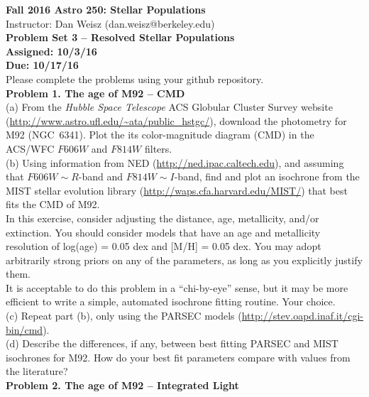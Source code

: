 \documentclass{article}
\begin{document}
\noindent \textbf{\large{Fall 2016 Astro 250: Stellar Populations}} \\
\noindent Instructor: Dan Weisz (dan.weisz@berkeley.edu) \\
\textbf{\large{Problem Set 3 -- Resolved Stellar Populations}} \\
\textbf{{Assigned: 10/3/16}} \\
\textbf{{Due: 10/17/16}} \\

Please complete the problems using your github repository. \\


\noindent \textbf{Problem 1. The age of M92 -- CMD} \\ 

(a) From the \textit{Hubble Space Telescope} ACS Globular Cluster Survey website (\url{http://www.astro.ufl.edu/~ata/public_hstgc/}), download the photometry for M92 (NGC~6341).  Plot the its color-magnitude diagram (CMD) in the ACS/WFC $F606W$ and $F814W$ filters. \\

(b) Using information from NED (\url{http://ned.ipac.caltech.edu}), and assuming that $F606W \sim R$-band and $F814W \sim I$-band, find and plot an isochrone from the MIST stellar evolution library (\url{http://waps.cfa.harvard.edu/MIST/}) that best fits the CMD of M92.   \\

In this exercise, consider adjusting the distance, age, metallicity, and/or extinction.  You should consider models that have an age and metallicity resolution of log(age) = 0.05 dex and [M/H] = 0.05 dex. You may adopt arbitrarily strong priors on any of the parameters, as long as you explicitly justify them. \\

It is acceptable to do this problem in a ``chi-by-eye'' sense, but it may be more efficient to write a simple, automated isochrone fitting routine. Your choice. \\

(c) Repeat part (b), only using the PARSEC models (\url{http://stev.oapd.inaf.it/cgi-bin/cmd}). \\

(d) Describe the differences, if any, between best fitting PARSEC and MIST isochrones for M92.  How do your best fit parameters compare with values from the literature? \\

\noindent \textbf{Problem 2. The age of M92 -- Integrated Light} \\ 
\end{document}
